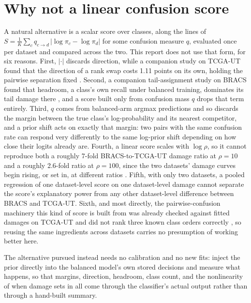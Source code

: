 \documentclass[11pt]{article}
\begin{document}
\section{Why not a linear confusion score}
\label{sec:why-not-score}
A natural alternative is a scalar score over classes, along the lines of $S=\frac{1}{K}\sum_c q_{c\rightarrow d}\,|\log\pi_c-\log\pi_d|$ for some confusion measure $q$, evaluated once per dataset and compared across the two. This report does not use that form, for six reasons. First, $|\cdot|$ discards direction, while a companion study on TCGA-UT found that the direction of a rank swap costs 1.11 points on its own, holding the pairwise separation fixed \citep{queisler2026worstRateTcga}. Second, a companion tail-assignment study on BRACS found that headroom, a class's own recall under balanced training, dominates its tail damage there \citep{queisler2026tailBracs}, and a score built only from confusion mass $q$ drops that term entirely. Third, $q$ comes from balanced-arm argmax predictions and so discards the margin between the true class's log-probability and its nearest competitor, and a prior shift acts on exactly that margin: two pairs with the same confusion rate can respond very differently to the same log-prior shift depending on how close their logits already are. Fourth, a linear score scales with $\log\rho$, so it cannot reproduce both a roughly 7-fold BRACS-to-TCGA-UT damage ratio at $\rho=10$ and a roughly 2.6-fold ratio at $\rho=100$, since the two datasets' damage curves begin rising, or set in, at different ratios \citep{queisler2026prevalenceTcga, queisler2026prevalenceBracs}. Fifth, with only two datasets, a pooled regression of one dataset-level score on one dataset-level damage cannot separate the score's explanatory power from any other dataset-level difference between BRACS and TCGA-UT. Sixth, and most directly, the pairwise-confusion machinery this kind of score is built from was already checked against fitted damages on TCGA-UT and did not rank three known class orders correctly \citep{queisler2026worstTcga}, so reusing the same ingredients across datasets carries no presumption of working better here.

The alternative pursued instead needs no calibration and no new fits: inject the prior directly into the balanced model's own stored decisions and measure what happens, so that margins, direction, headroom, class count, and the nonlinearity of when damage sets in all come through the classifier's actual output rather than through a hand-built summary.
\end{document}
